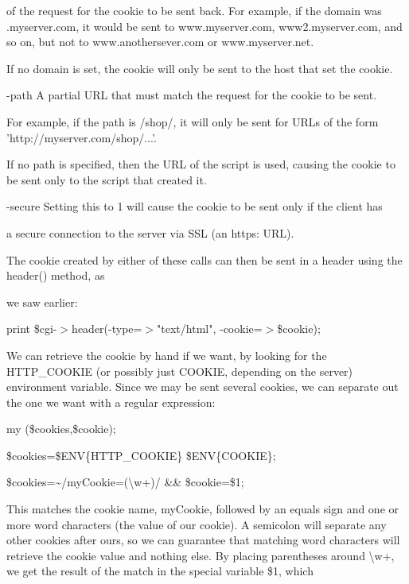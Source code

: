 \documentclass[a4paper,11pt]{book}
\begin{document}
\noindent of the request for the cookie to be sent back. For example, if the domain was .myserver.com, it would be sent to www.myserver.com, www2.myserver.com, and so on, but not to www.anothersever.com or www.myserver.net.

\noindent 

\noindent If no domain is set, the cookie will only be sent to the host that set the cookie.

\noindent -path A partial URL that must match the request for the cookie to be sent.

\noindent For example, if the path is /shop/, it will only be sent for URLs of the form 'http://myserver.com/shop/...'.

\noindent If no path is specified, then the URL of the script is used, causing the cookie to be sent only to the script that created it.

\noindent -secure Setting this to 1 will cause the cookie to be sent only if the client has

\noindent a secure connection to the server via SSL (an https: URL).

\noindent 

\noindent The cookie created by either of these calls can then be sent in a header using the header() method, as

\noindent we saw earlier:

\noindent 

\noindent print \$cgi-$>$header(-type=$>$"text/html", -cookie=$>$\$cookie);

\noindent 

\noindent We can retrieve the cookie by hand if we want, by looking for the HTTP\_COOKIE (or possibly just COOKIE, depending on the server) environment variable. Since we may be sent several cookies, we can separate out the one we want with a regular expression:

\noindent 

\noindent my (\$cookies,\$cookie);

\noindent \$cookies=\$ENV\{HTTP\_COOKIE\} \textbar \textbar  \$ENV\{COOKIE\};

\noindent \$cookies=\~{}/myCookie=(\textbackslash w+)/ \&\& \$cookie=\$1;

\noindent 

\noindent This  matches  the  cookie  name,  myCookie, followed  by  an  equals  sign  and  one  or  more  word characters  (the  value  of  our  cookie).  A  semicolon  will  separate  any  other  cookies  after  ours,  so  we can  guarantee  that  matching  word  characters  will  retrieve  the  cookie  value  and  nothing  else.  By placing  parentheses  around  \textbackslash w+,  we  get  the  result  of  the  match  in  the  special  variable  \$1,  which
\end{document}
